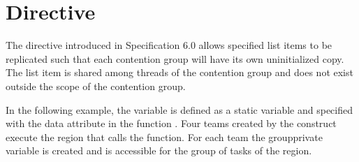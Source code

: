 \section{ Directive}
\label{sec:groupprivate}

The  directive introduced in Specification 6.0
allows specified list items to be replicated such that each contention 
group will have its own uninitialized copy. The list item is shared among
threads of the contention group and does not exist 
outside the scope of the contention group. 

In the following example, the variable  is defined as a static 
variable and specified with the  data attribute in 
the function . Four teams created by the  construct
execute the  region that calls the 
 function. For each team the groupprivate variable  
is created and is accessible for the group of tasks of the  region.


